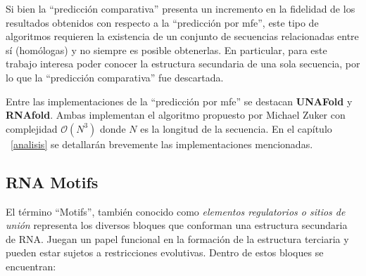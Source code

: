 Si bien la ``predicción comparativa'' presenta un incremento en la fidelidad de los resultados obtenidos con respecto a la ``predicción por mfe'', este tipo de algoritmos requieren la existencia de un conjunto de secuencias relacionadas entre sí (homólogas) y no siempre es posible obtenerlas. En particular, para este trabajo interesa poder conocer la estructura secundaria de una sola secuencia, por lo que la ``predicción comparativa'' fue descartada.

\par Entre las implementaciones de la ``predicción por mfe'' se destacan \textbf{UNAFold}\cite{unafold} y \textbf{RNAfold}\cite{Hofacker94}. Ambas implementan el algoritmo propuesto por Michael Zuker con complejidad $\mathcal{O}(N^{3})$ donde $N$ es la longitud de la secuencia. En el capítulo ~\ref{analisis} se detallarán brevemente las implementaciones mencionadas.

\subsection{RNA Motifs}
\label{RNAmotifs}
El término ``Motifs''\cite{motifs}, también conocido como \emph{elementos regulatorios o sitios de unión} representa los diversos bloques que conforman una estructura secundaria de RNA. Juegan un papel funcional en la formación de la estructura terciaria y pueden estar sujetos a restricciones evolutivas. Dentro de estos bloques se encuentran:

